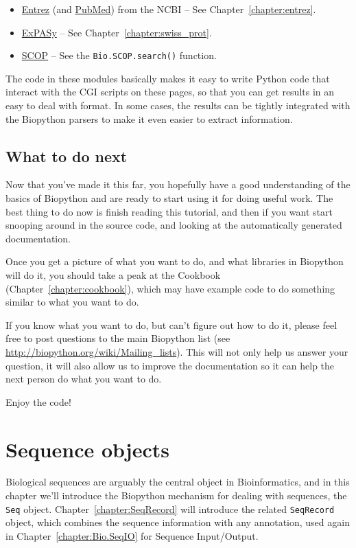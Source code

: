 \documentclass{report}
\begin{document}
\begin{itemize}
  \item \href{http://www.ncbi.nlm.nih.gov/Entrez/}{Entrez} (and \href{http://www.ncbi.nlm.nih.gov/PubMed/}{PubMed}) from the NCBI -- See Chapter~\ref{chapter:entrez}.
  \item \href{http://www.expasy.org/}{ExPASy} -- See Chapter~\ref{chapter:swiss_prot}.
  \item \href{http://scop.mrc-lmb.cam.ac.uk/scop/}{SCOP} -- See the \verb|Bio.SCOP.search()| function.
\end{itemize}

The code in these modules basically makes it easy to write Python code that interact with the CGI scripts on these pages, so that you can get results in an easy to deal with format. In some cases, the results can be tightly integrated with the Biopython parsers to make it even easier to extract information.

\section{What to do next}

Now that you've made it this far, you hopefully have a good understanding of the basics of Biopython and are ready to start using it for doing useful work. The best thing to do now is finish reading this tutorial, and then if you want start snooping around in the source code, and looking at the automatically generated documentation.

Once you get a picture of what you want to do, and what libraries in Biopython will do it, you should take a peak at the Cookbook (Chapter~\ref{chapter:cookbook}), which may have example code to do something similar to what you want to do.

If you know what you want to do, but can't figure out how to do it, please feel free to post questions to the main Biopython list (see \url{http://biopython.org/wiki/Mailing_lists}). This will not only help us answer your question, it will also allow us to improve the documentation so it can help the next person do what you want to do.

Enjoy the code!

\chapter{Sequence objects}
\label{chapter:Bio.Seq}

Biological sequences are arguably the central object in Bioinformatics, and in this chapter we'll introduce the Biopython mechanism for dealing with sequences, the \verb|Seq| object.
Chapter~\ref{chapter:SeqRecord} will introduce the related \verb|SeqRecord| object, which combines the sequence information with any annotation, used again in Chapter~\ref{chapter:Bio.SeqIO} for Sequence Input/Output.
\end{document}
